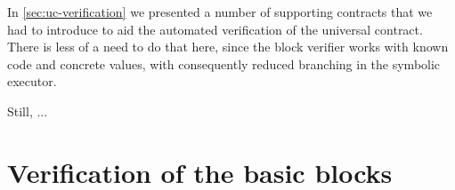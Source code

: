 In \cref{sec:uc-verification} we presented a number of supporting contracts that we had to introduce to aid the automated verification of the universal contract. There is less of a need to do that here, since the block verifier works with known code and concrete values, with consequently reduced branching in the symbolic executor.

Still, ...







\section{Verification of the basic blocks}

